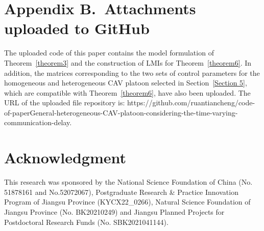 \documentclass[a4paper]{cas-sc}
\begin{document}
\section*{Appendix B.~Attachments uploaded to GitHub}
\label{AppendixB}
The uploaded code of this paper contains the model formulation of Theorem~\ref{theorem3} and the construction of LMIs for Theorem~\ref{theorem6}. In addition, the matrices corresponding to the two sets of control parameters for the homogeneous and heterogeneous CAV platoon selected in Section~\ref{Section 5}, which are compatible with Theorem~\ref{theorem6}, have also been uploaded. The URL of the uploaded file repository is:
https://github.com/ruantiancheng/code-of-paperGeneral-heterogeneous-CAV-platoon-considering-the-time-varying-communication-delay.

\printcredits

\section*{Acknowledgment}

This research was sponsored by the National Science Foundation of China (No. 51878161 and No.52072067), Postgraduate Research \& Practice Innovation Program of Jiangsu Province (KYCX22\_0266), Natural Science Foundation of Jiangsu Province (No. BK20210249) and Jiangsu Planned Projects for Postdoctoral Research Funds (No. SBK2021041144).

% 





\end{document}
